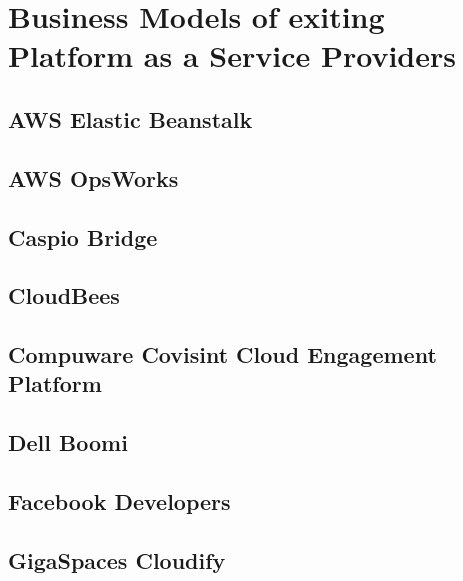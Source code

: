 \chapter{Business Models of exiting Platform as a Service Providers}\label{ch:app01}

\section{AWS Elastic Beanstalk}


\newpage
\section{AWS OpsWorks}


\section{Caspio Bridge}


\newpage
\section{CloudBees}\label{ch:app01:cb}


\newpage
\section{Compuware Covisint Cloud Engagement Platform}


\newpage
\section{Dell Boomi}


\section{Facebook Developers}\label{ch:app01:fb}


\section{GigaSpaces Cloudify}\label{ch:app01:gs}


